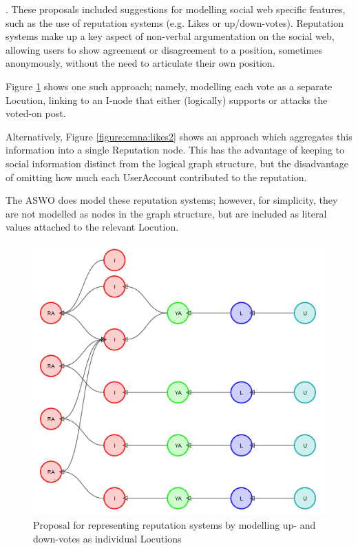 
 \citep{Blount2014}. These proposals included suggestions for modelling social web specific features, such as the use of reputation systems (e.g. Likes or up/down-votes). Reputation systems make up a key aspect of non-verbal argumentation on the social web, allowing users to show agreement or disagreement to a position, sometimes anonymously, without the need to articulate their own position.

Figure \ref{figure:cmna:likes1} shows one such approach; namely, modelling each vote as a separate Locution, linking to an I-node that either (logically) supports or attacks the voted-on post.

Alternatively, Figure \ref{figure:cmna:likes2} shows an approach which aggregates this information into a single Reputation node. This has the advantage of keeping to social information distinct from the logical graph structure, but the disadvantage of omitting how much each UserAccount contributed to the reputation.

The ASWO does model these  reputation systems; however, for simplicity, they are not modelled as nodes in the graph structure, but are included as literal values attached to the relevant Locution. 


\begin{figure}
\centering
\includegraphics[scale=\scaleProps]{./figures/cmna_proposals/likes2.png}
\caption{Proposal for representing reputation systems by modelling up- and down-votes as individual Locutions}
\label{figure:cmna:likes1}
\end{figure}

